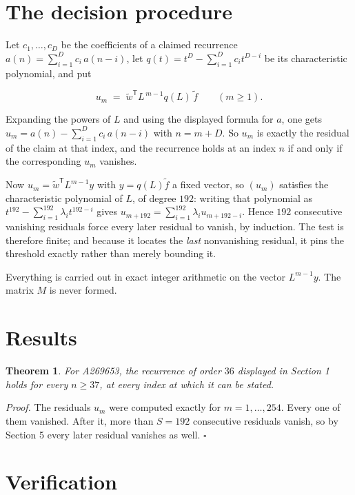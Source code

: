 \documentclass[11pt]{article}
\newtheorem{theorem}{Theorem}
\theoremstyle{definition}
\begin{document}
\section{The decision procedure}

Let $c_1,\dots,c_D$ be the coefficients of a claimed recurrence $a(n) = \sum_{i=1}^{D} c_i\,a(n-i)$, let $q(t) = t^{D} - \sum_{i=1}^{D} c_i t^{D-i}$ be its characteristic polynomial, and put

\[u_m \;=\; \tilde w^{\mathsf T} L^{\,m-1} q(L)\,\tilde f \qquad (m \ge 1).\]

Expanding the powers of $L$ and using the displayed formula for $a$, one gets $u_m = a(n) - \sum_{i=1}^{D} c_i\,a(n-i)$ with $n = m + D$. So $u_m$ is exactly the residual of the claim at that index, and the recurrence holds at an index $n$ if and only if the corresponding $u_m$ vanishes.

Now $u_m = \tilde w^{\mathsf T} L^{m-1} y$ with $y = q(L)\tilde f$ a fixed vector, so $(u_m)$ satisfies the characteristic polynomial of $L$, of degree $192$: writing that polynomial as $t^{192} - \sum_{i=1}^{192} \lambda_i t^{192-i}$ gives $u_{m+192} = \sum_{i=1}^{192} \lambda_i u_{m+192-i}$. Hence $192$ consecutive vanishing residuals force every later residual to vanish, by induction. The test is therefore finite; and because it locates the {\itshape last} nonvanishing residual, it pins the threshold exactly rather than merely bounding it.

Everything is carried out in exact integer arithmetic on the vector $L^{m-1}y$. The matrix $M$ is never formed.

\section{Results}

\begin{theorem} For A269653, the recurrence of order $36$ displayed in Section 1 holds for every $n \ge 37$, at every index at which it can be stated.\end{theorem}

{\itshape Proof.} The residuals $u_m$ were computed exactly for $m = 1,\dots,254$. Every one of them vanished. After it, more than $S = 192$ consecutive residuals vanish, so by Section 5 every later residual vanishes as well. $\square$

\section{Verification}
\end{document}
